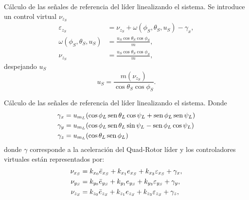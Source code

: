 \documentclass[hyperref={pdfpagelabels=false}]{beamer}
\begin{document}
\begin{frame}{Cálculo de las señales de referencia del l\'ider linealizando el sistema.} 
	Se introduce un control virtual $\nu_{z_S}$
	\begin{equation}
		\begin{split}
			\varepsilon_{z_S} &= \nu_{z_S} + \omega(\phi_S,\theta_S,u_S)- \gamma_x,\\
			\omega(\phi_S,\theta_S,u_S) &= \frac{u_S \cos{\theta_S}\cos{\phi_S}}{m},\\
			\nu_{z_S} &= \frac{u_S \cos{\theta_S}\cos{\phi_S}}{m},
		\end{split}
	\end{equation}
	despejando $u_S$
	\begin{equation}
		u_S = \frac{m (\nu_{z_S})}{\cos{\theta_S}\cos{\phi_S}}.
	\end{equation}
\end{frame}

\begin{frame}{Cálculo de las señales de referencia del l\'ider linealizando el sistema.} 
Donde 
\begin{equation}
	\begin{split}
		\gamma_x &= u_{m_L}(\cos{\phi_L}\operatorname{sen}{\theta_{L}}\cos{\psi_L}+\operatorname{sen}{\phi_L}\operatorname{sen}{\psi_L})\\ 
		\gamma_y &= u_{m_L}(\cos{\phi_L}\operatorname{sen}{\theta_{L}}\sin{\psi_L}-\operatorname{sen}{\phi_L}\cos{\psi_L})\\ 
		\gamma_z &= u_{m_L}(\cos{\theta_{L}\operatorname{sen}{\phi_L}}) 
	\end{split}
\end{equation}
donde $\gamma$ corresponde a la aceleración del Quad-Rotor líder y los controladores virtuales están representados por:
\begin{subequations}
	\begin{align}
		\nu_{x_S} &=k_{x_0}\Bar{e}_{x_S}+ k_{x_1}e_{x_S} + k_{x_3}\varepsilon_{x_S} + \gamma_x,\\
		\nu_{y_S} &=k_{y_0}\Bar{e}_{y_S}+ k_{y_1}e_{y_S} + k_{y_3}\varepsilon_{y_S}+ \gamma_y,\\
		\nu_{z_S} &=k_{z_0}\Bar{e}_{z_S}+ k_{z_1}e_{z_S} + k_{z_3}\varepsilon_{z_S}+ \gamma_z,
	\end{align}
	\label{eq:cvl2}
\end{subequations}

\end{frame}
\end{document}

